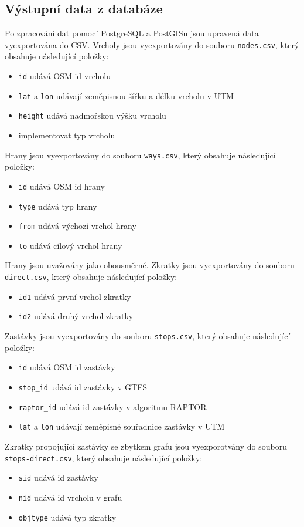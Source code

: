 \subsection{Výstupní data z databáze}
Po zpracování dat pomocí PostgreSQL a PostGISu jsou upravená data vyexportována
do CSV. Vrcholy jsou vyexportovány do souboru {\tt nodes.csv}, který obsahuje
následující položky:
\begin{itemize}
	\item {\tt id} udává OSM id vrcholu
	\item {\tt lat} a {\tt lon} udávají zeměpisnou šířku a délku vrcholu v
	UTM
	\item {\tt height} udává nadmořskou výšku vrcholu
	\item \TODO implementovat typ vrcholu
\end{itemize} 
Hrany jsou vyexportovány do souboru {\tt ways.csv}, který obsahuje následující
položky:
\begin{itemize}
	\item {\tt id} udává OSM id hrany
	\item {\tt type} udává typ hrany
	\item {\tt from} udává výchozí vrchol hrany
	\item {\tt to} udává cílový vrchol hrany
\end{itemize} 
Hrany jsou uvažovány jako obousměrné.
Zkratky jsou vyexportovány do souboru {\tt direct.csv}, který obsahuje
následující položky:
\begin{itemize}
	\item {\tt id1} udává první vrchol zkratky
	\item {\tt id2} udává druhý vrchol zkratky
\end{itemize} 
Zastávky jsou vyexportovány do souboru {\tt stops.csv}, který obsahuje
následující položky:
\begin{itemize}
	\item {\tt id} udává OSM id zastávky
	\item {\tt stop\_id} udává id zastávky v GTFS
	\item {\tt raptor\_id} udává id zastávky v algoritmu RAPTOR
	\item {\tt lat} a {\tt lon} udávají zeměpisné souřadnice zastávky v UTM
\end{itemize} 
Zkratky propojující zastávky se zbytkem grafu jsou vyexporotvány do souboru {\tt
stops-direct.csv}, který obsahuje následující položky:
\begin{itemize}
	\item {\tt sid} udává id zastávky
	\item {\tt nid} udává id vrcholu v grafu
	\item {\tt objtype} udává typ zkratky
\end{itemize} 
